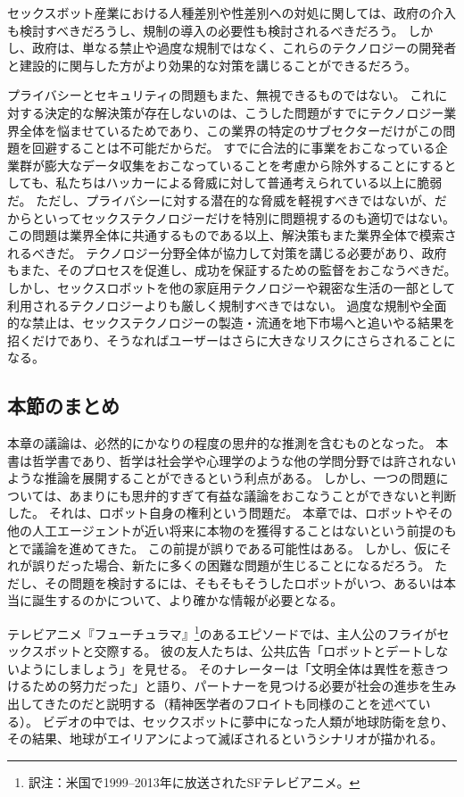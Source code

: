 \documentclass[paper=a4,book,openany]{jlreq}
\begin{document}
セックスボット産業における人種差別や性差別への対処に関しては、政府の介入も検討すべきだろうし、規制の導入の必要性も検討されるべきだろう。
しかし、政府は、単なる禁止や過度な規制ではなく、これらのテクノロジーの開発者と建設的に関与した方がより効果的な対策を講じることができるだろう。

プライバシーとセキュリティの問題もまた、無視できるものではない。
これに対する決定的な解決策が存在しないのは、こうした問題がすでにテクノロジー業界全体を悩ませているためであり、この業界の特定のサブセクターだけがこの問題を回避することは不可能だからだ。
すでに合法的に事業をおこなっている企業群が膨大なデータ収集をおこなっていることを考慮から除外することにするとしても、私たちはハッカーによる脅威に対して普通考えられている以上に脆弱だ。
ただし、プライバシーに対する潜在的な脅威を軽視すべきではないが、だからといってセックステクノロジーだけを特別に問題視するのも適切ではない。
この問題は業界全体に共通するものである以上、解決策もまた業界全体で模索されるべきだ。
テクノロジー分野全体が協力して対策を講じる必要があり、政府もまた、そのプロセスを促進し、成功を保証するための監督をおこなうべきだ。
しかし、セックスロボットを他の家庭用テクノロジーや親密な生活の一部として利用されるテクノロジーよりも厳しく規制すべきではない。
過度な規制や全面的な禁止は、セックステクノロジーの製造・流通を地下市場へと追いやる結果を招くだけであり、そうなればユーザーはさらに大きなリスクにさらされることになる。

\subsection{本節のまとめ}

本章の議論は、必然的にかなりの程度の思弁的な推測を含むものとなった。
本書は哲学書であり、哲学は社会学や心理学のような他の学問分野では許されないような推論を展開することができるという利点がある。
しかし、一つの問題については、あまりにも思弁的すぎて有益な議論をおこなうことができないと判断した。
それは、ロボット自身の権利という問題だ。
本章では、ロボットやその他の人工エージェントが近い将来に本物のを獲得することはないという前提のもとで議論を進めてきた。
この前提が誤りである可能性はある。
しかし、仮にそれが誤りだった場合、新たに多くの困難な問題が生じることになるだろう。
ただし、その問題を検討するには、そもそもそうしたロボットがいつ、あるいは本当に誕生するのかについて、より確かな情報が必要となる。

テレビアニメ『フューチュラマ』\footnote{訳注：米国で1999--2013年に放送されたSFテレビアニメ。}のあるエピソードでは、主人公のフライがセックスボットと交際する。
彼の友人たちは、公共広告「ロボットとデートしないようにしましょう」を見せる。
そのナレーターは「文明全体は異性を惹きつけるための努力だった」と語り、パートナーを見つける必要が社会の進歩を生み出してきたのだと説明する（精神医学者のフロイトも同様のことを述べている）。
ビデオの中では、セックスボットに夢中になった人類が地球防衛を怠り、その結果、地球がエイリアンによって滅ぼされるというシナリオが描かれる。
\end{document}
